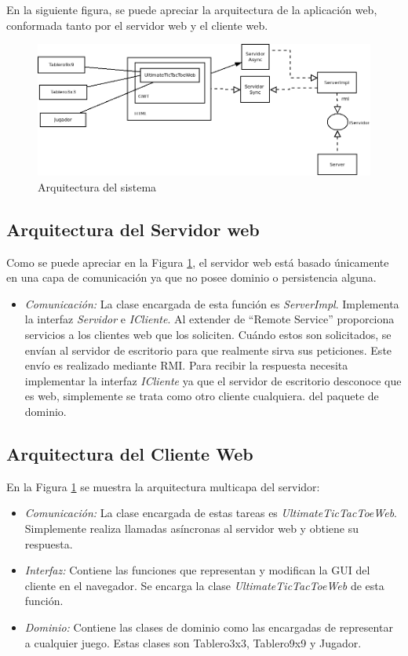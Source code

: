 En la siguiente figura, se puede apreciar la arquitectura de la aplicación web, conformada tanto por el servidor web y el cliente web.

 \begin{figure}[h]
 \centering
 \includegraphics[scale=0.45]{img/diagrama.png}
 \caption{Arquitectura del sistema}
 \label{arq_sistema}
 \end{figure}

\subsection{Arquitectura del Servidor web}

Como se puede apreciar en la Figura \ref{arq_sistema}, el servidor web está basado únicamente en una capa de comunicación ya que no posee dominio o persistencia alguna.

\begin{itemize}
  \item \emph{Comunicación:} La clase encargada de esta función es \emph{ServerImpl}. Implementa la interfaz \emph{Servidor} e \emph{ICliente}. Al extender de ``Remote Service'' proporciona servicios a los clientes web que los soliciten. Cuándo estos son solicitados, se envían al servidor de escritorio para que realmente sirva sus peticiones. Este envío es realizado mediante RMI. Para recibir la respuesta necesita implementar la interfaz \emph{ICliente} ya que el servidor de escritorio desconoce que es web, simplemente se trata como otro cliente cualquiera.
 del paquete de dominio.
\end{itemize}

\subsection{Arquitectura del Cliente Web}

En la Figura \ref{arq_sistema} se muestra la arquitectura multicapa del servidor:

\begin{itemize}
 \item \emph{Comunicación:} La clase encargada de estas tareas es \emph{UltimateTicTacToeWeb}. Simplemente realiza llamadas asíncronas al servidor web y obtiene su respuesta.
  \item \emph{Interfaz:} Contiene las funciones que representan y modifican la GUI del cliente en el navegador. Se encarga la clase \emph{UltimateTicTacToeWeb} de esta función.
 \item \emph{Dominio:} Contiene las clases de dominio como las encargadas de representar a cualquier juego. Estas clases son Tablero3x3, Tablero9x9 y Jugador.
\end{itemize}
